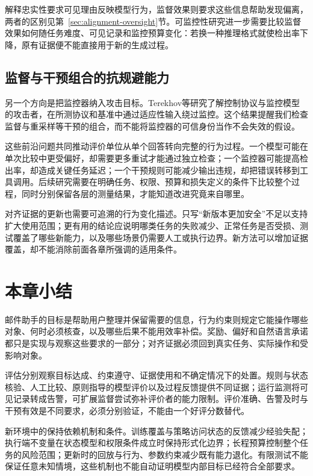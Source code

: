 解释忠实性要求可见理由反映模型行为，监督效果则要求这些信息帮助发现偏离，两者的区别见第~\ref{sec:alignment-oversight}节。可监控性研究进一步需要比较监督效果如何随任务难度、可见记录和监控预算变化：若换一种推理格式就使检出率下降，原有证据便不能直接用于新的生成过程。

\subsection{监督与干预组合的抗规避能力}

另一个方向是把监控器纳入攻击目标。Terekhov等研究了解控制协议与监控模型的攻击者，在所测协议和基准中通过适应性输入绕过监控。这个结果提醒我们检查监督与重采样等干预的组合，而不能将监控器的可信身份当作不会失效的假设。

这些前沿问题共同推动评价单位从单个回答转向完整的行为过程。一个模型可能在单次比较中更受偏好，却需要更多重试才能通过独立检查；一个监控器可能提高检出率，却造成关键任务延迟；一个干预规则可能减少输出违规，却把错误转移到工具调用。后续研究需要在明确任务、权限、预算和损失定义的条件下比较整个过程，同时分别保留各层的测量结果，才能知道改进究竟来自哪里。

对齐证据的更新也需要可追溯的行为变化描述。只写“新版本更加安全”不足以支持扩大使用范围；更有用的结论应说明哪类任务的失败减少、正常任务是否受损、测试覆盖了哪些新能力，以及哪些场景仍需要人工或执行边界。新方法可以增加证据覆盖，却不能消除前面各章所强调的适用条件。

\section{本章小结}
\label{sec:alignment-summary}

邮件助手的目标是帮助用户整理并保留需要的信息，行为约束则规定它能操作哪些对象、何时必须核查，以及哪些后果不能用效率补偿。奖励、偏好和自然语言承诺都只是实现与观察这些要求的一部分；对齐证据必须回到真实任务、实际操作和受影响对象。

评估分别观察目标达成、约束遵守、证据使用和不确定情况下的处置。规则与状态核验、人工比较、原则指导的模型评价以及过程反馈提供不同证据；运行监测将可见记录转成告警，可扩展监督尝试弥补评价者的能力限制。评价准确、告警及时与干预有效是不同要求，必须分别验证，不能由一个好评分数替代。

新环境中的保持依赖机制和条件。训练覆盖与策略访问状态的反馈减少经验失配；执行端不变量在状态模型和权限条件成立时保持形式化边界；长程预算控制整个任务的风险范围；更新时的回放与行为、参数约束减少既有能力退化。有限测试不能保证任意未知情境，这些机制也不能自动证明模型内部目标已经符合全部要求。

